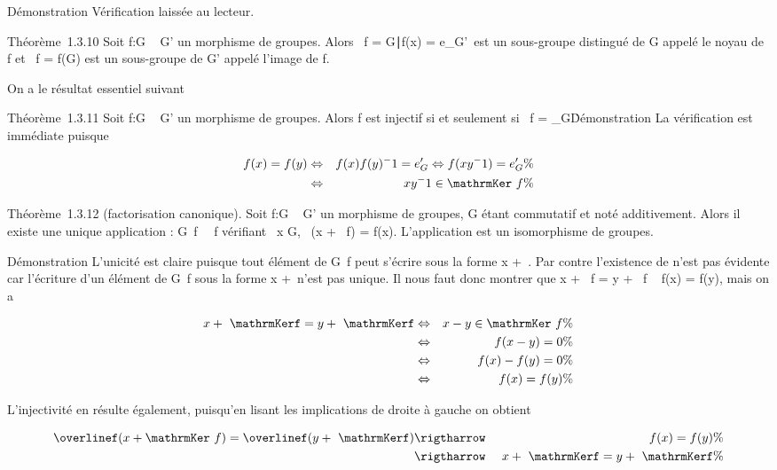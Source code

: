 Démonstration Vérification laissée au lecteur.

Théorème~1.3.10 Soit f:G \rightarrow~ G' un morphisme de groupes. Alors
\mathrmKer~f =
\x \in G∣f(x) =
e_G'\ est un sous-groupe distingué de G appelé
le noyau de f et \mathrmIm~f
= f(G) est un sous-groupe de G' appelé l'image de f.

On a le résultat essentiel suivant

Théorème~1.3.11 Soit f:G \rightarrow~ G' un morphisme de groupes. Alors f est
injectif si et seulement si
\mathrmKer~f =
\e_G\.

Démonstration La vérification est immédiate puisque

\begin{align*} f(x) = f(y)&
\Leftrightarrow & f(x)f(y)^-1 = e_ G'
\Leftrightarrow f(xy^-1) = e_ G'\%&
\\ & \Leftrightarrow &
xy^-1
\in\mathrmKer~f \%&
\\ \end{align*}

Théorème~1.3.12 (factorisation canonique). Soit f:G \rightarrow~ G' un morphisme de
groupes, G étant commutatif et noté additivement. Alors il existe une
unique application \overlinef :
G\diagup\mathrmKer~f
\rightarrow~\mathrmIm~f vérifiant
\forall~x \in G, \overlinef~(x
+ \mathrmKer~f) = f(x).
L'application \overlinef est un isomorphisme de
groupes.

Démonstration L'unicité est claire puisque tout élément de
G\diagup\mathrmKer~f peut s'écrire
sous la forme x +\
\mathrmKerf. Par contre l'existence de
\overlinef n'est pas évidente car l'écriture d'un
élément de G\diagup\mathrmKer~f
sous la forme x +\
\mathrmKerf n'est pas unique. Il nous faut donc
montrer que x + \mathrmKer~f
= y + \mathrmKer~f \rigtharrow~ f(x) =
f(y), mais on a

\begin{align*} x +\
\mathrmKerf = y +\
\mathrmKerf& \Leftrightarrow & x - y
\in\mathrmKer~f \%&
\\ & \Leftrightarrow & f(x
- y) = 0 \%& \\ &
\Leftrightarrow & f(x) - f(y) = 0\%&
\\ & \Leftrightarrow & f(x)
= f(y) \%& \\
\end{align*}

L'injectivité en résulte également, puisqu'en lisant les implications de
droite à gauche on obtient

\begin{align*} \overlinef(x
+ \mathrmKer~f) =
\overlinef(y +\
\mathrmKerf)& \rigtharrow~& f(x) = f(y) \%&
\\ & \rigtharrow~& x +\
\mathrmKerf = y +\
\mathrmKerf\%& \\
\end{align*}

